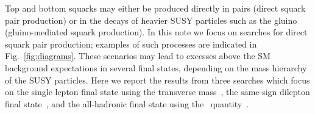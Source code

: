 
Top and bottom squarks may either be produced directly in pairs
(direct squark pair production) or in the decays of heavier SUSY particles such as the gluino (gluino-mediated squark production). 
In this note we focus on searches for direct squark pair production; examples of such processes are indicated in Fig.~\ref{fig:diagrams}.
These scenarios may lead to excesses above the SM background expectations in several final states, 
depending on the mass hierarchy of the SUSY particles.
Here we report the results from three searches which focus on the single lepton final state using the transverse
mass~\cite{ref:stop}, the same-sign dilepton final state~\cite{ref:ss}, and the all-hadronic final state using the \alphat\ quantity~\cite{ref:alphat}.

